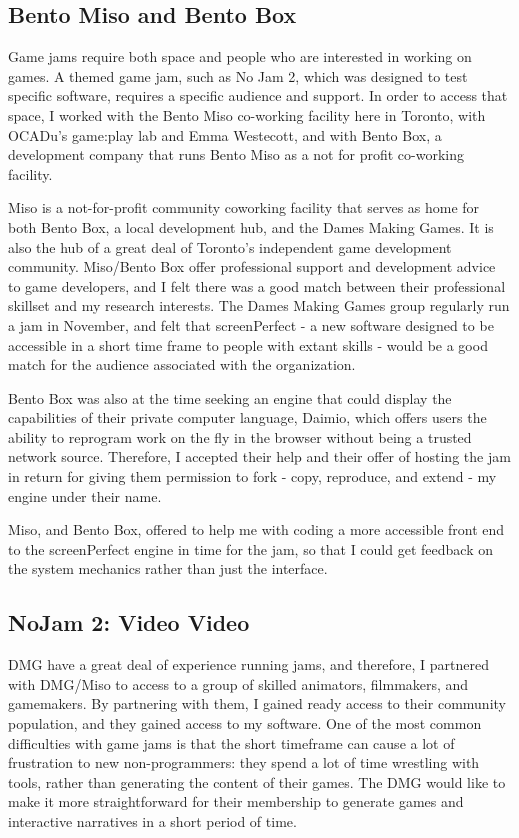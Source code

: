 \subsection{Bento Miso and Bento Box}
Game jams require both space and people who are interested in working on games. A themed game jam, such as No Jam 2, which was designed to test specific software, requires a specific audience and support. In order to access that space, I worked with the Bento Miso co-working facility here in Toronto, with OCADu's game:play lab and Emma Westecott, and with Bento Box, a development company that runs Bento Miso as a not for profit co-working facility.

Miso is a not-for-profit community coworking facility that serves as home for both Bento Box, a local development hub, and the Dames Making Games. It is also the hub of a great deal of Toronto's independent game development community. Miso/Bento Box offer professional support and development advice to game developers, and I felt there was a good match between their professional skillset and my research interests. The Dames Making Games group regularly run a jam in November, and felt that screenPerfect - a new software designed to be accessible in a short time frame to people with extant skills - would be a good match for the audience associated with the organization. 

Bento Box was also at the time seeking an engine that could display the capabilities of their private computer language, Daimio, which offers users the ability to reprogram work on the fly in the browser without being a trusted network source. Therefore, I accepted their help and their offer of hosting the jam in return for giving them permission to fork - copy, reproduce, and extend - my engine under their name. 

Miso, and Bento Box, offered to help me with coding a more accessible front end to the screenPerfect engine in time for the jam, so that I could get feedback on the system mechanics rather than just the interface. 

\subsection{NoJam 2: Video Video}
DMG have a great deal of experience running jams, and therefore, I partnered with DMG/Miso to access to a group of skilled animators, filmmakers, and gamemakers. By partnering with them, I gained ready access to their community population, and they gained access to my software. One of the most common difficulties with game jams is that the short timeframe can cause a lot of frustration to new non-programmers: they spend a lot of time wrestling with tools, rather than generating the content of their games. The DMG would like to make it more straightforward for their membership to generate games and interactive narratives in a short period of time.

